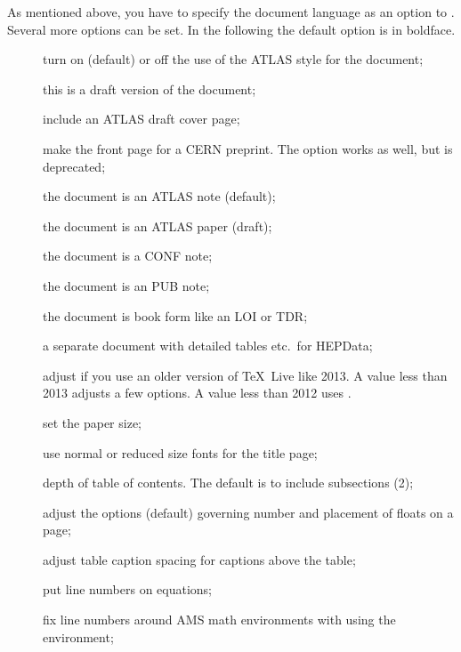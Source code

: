 As mentioned above, you have to specify the document language as an option to .
Several more options can be set.
In the following the default option is in boldface.
\begin{description}
\item[] turn on (default) or off the use of the ATLAS style for the document;
\item[] this is a draft version of the document;
\item[] include an ATLAS draft cover page;
\item[] make the front page for a CERN preprint.
  The option  works as well, but is deprecated;
\item[] the document is an ATLAS note (default);
\item[] the document is an ATLAS paper (draft);
\item[] the document is a CONF note;
\item[] the document is an PUB note;
\item[] the document is book form like an LOI or TDR;
\item[] a separate document with detailed tables etc.\ for HEPData;
\item[] adjust if you use an older version of \TeX\ Live like 2013.
  A value less than 2013 adjusts a few  options.
  A value less than 2012 uses .
\item[] set the paper size;
\item[] use normal or reduced size fonts for the title page;
\item[] depth of table of contents. The default is to include subsections (2);
\item[] adjust the options (default) governing number and placement of floats on a page;
\item[] adjust table caption spacing for captions above the table;
\item[] put line numbers on equations;
\item[] fix line numbers around AMS math environments with using the  environment;

\end{description}
